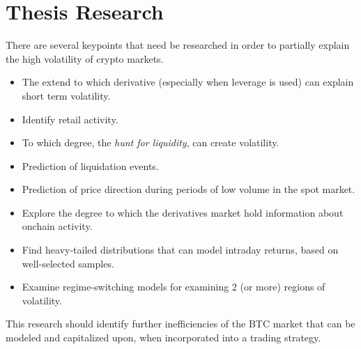 \documentclass[11pt]{article}
\begin{document}
\section*{Thesis Research}
There are several keypoints that need be researched in order to partially explain the high volatility of crypto markets.
\begin{itemize}
\item The extend to which derivative (especially when leverage is used) can explain short term volatility.

\item Identify retail activity.

\item To which degree, the \textit{hunt for liquidity}, can create volatility.

\item Prediction of liquidation events.

\item Prediction of price direction during periods of low volume in the spot market.

\item Explore the degree to which the derivatives market hold information about onchain activity.

\item Find heavy-tailed distributions that can model intraday returns, based on well-selected samples.

\item Examine regime-switching models for examining 2 (or more) regions of volatility.
\end{itemize}
This research should identify further inefficiencies of the BTC market that can be modeled and capitalized upon, when incorporated into a trading strategy.
\end{document}
